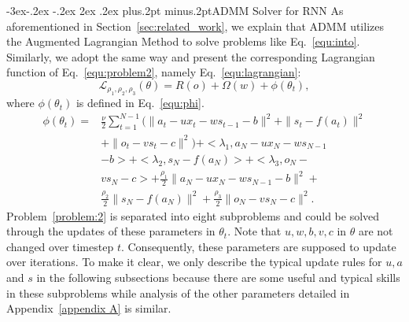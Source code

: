 \documentclass[twoside]{article}
\makeatletter
\def\subsection{\@startsection{subsection}{2}{\z@}%
 {-3ex\@plus -.2ex \@minus -.2ex}%
 {2ex \@plus.2ex}%
{\normalfont\normalsize\protect\baselineskip=12.5pt plus.2pt minus.2pt\bfseries}}
\makeatother
\begin{document}
\begin{multicols}{2}
\subsection{ADMM Solver for RNN}\label{subsec:admm solver}
As aforementioned in Section~\ref{sec:related_work}, we explain that ADMM utilizes the Augmented Lagrangian Method to solve problems like Eq.~\eqref{equ:into}.
Similarly, we adopt the same way and present the corresponding Lagrangian function of Eq.~\eqref{equ:problem2}, namely Eq.~\eqref{equ:lagrangian}:
\begin{equation}\label{equ:lagrangian}
    \mathcal{L}_{\rho_1,\rho_2,\rho_3}(\theta)=R(o) + \Omega(w)+\phi(\theta_t),
\end{equation}
where $\phi(\theta_t)$ is defined in Eq.~\eqref{equ:phi}.
\begin{equation}\label{equ:phi}
    \begin{aligned}
        \phi(\theta_t) =&\frac{\nu}{2}\sum_{t=1}^{N-1}(\|a_t-ux_t-ws_{t-1}-b\|^2 + \|s_t-f(a_t)\|^2  \\   
        &  +\|o_t-vs_t-c\|^2) + <\lambda_1, a_N - ux_N - ws_{N-1}   \\
        &   - b> + <\lambda_2, s_N - f(a_N)> + <\lambda_3, o_N- \\ 
        & vs_N - c> + \frac{\rho_1}{2}\| a_N - ux_N - ws_{N-1} - b\|^2 +   \\
        &  \frac{\rho_2}{2}\|s_N - f(a_N)\|^2 + \frac{\rho_3}{2}\|o_N - vs_N -c\|^2.
    \end{aligned}
\end{equation}
Problem~\ref{problem:2} is separated into eight subproblems and could be solved through the updates of these parameters in $\theta_t$. Note that $u,w,b,v,c$ in $\theta$ are not changed over timestep $t$. Consequently, these parameters are supposed to update over iterations. To make it clear, we only describe the typical update rules for $u, a$ and $s$ in the following subsections because there are some useful and typical skills in these subproblems while analysis of the other parameters detailed in Appendix~\ref{appendix A} is similar.


\end{multicols}
\end{document}
